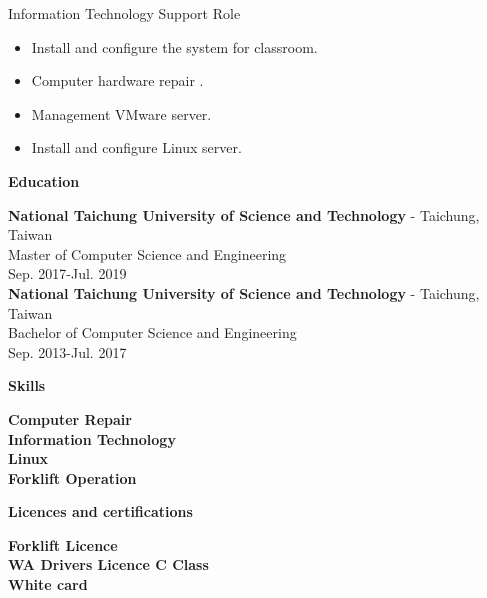 \documentclass[11pt a4paper]{article}
\begin{document}
Information Technology Support Role

\begin{itemize}
        \item {Install and configure the system for classroom.}
        \item {Computer hardware repair .}
        \item {Management VMware server.}
        \item {Install and configure Linux server.}
\end{itemize} 


\begin{LARGE}
\textbf{Education
\hrulefill
}
\end{LARGE}

\textbf{National Taichung University of Science and Technology} - Taichung, Taiwan\\
Master of Computer Science and Engineering\\
Sep. 2017-Jul. 2019\\

\textbf{National Taichung University of Science and Technology} - Taichung, Taiwan\\
Bachelor of Computer Science and Engineering\\
Sep. 2013-Jul. 2017\\

\begin{LARGE}
\textbf{Skills
\hrulefill\\
}
\end{LARGE}
\large{
\textbf{Computer Repair\\
Information Technology\\
Linux\\
Forklift Operation\\
}}

\begin{LARGE}

\textbf{Licences and certifications
\hrulefill\\
}
\end{LARGE}
\textbf{Forklift Licence\\
WA Drivers Licence C Class\\
White card
}
\end{document}
